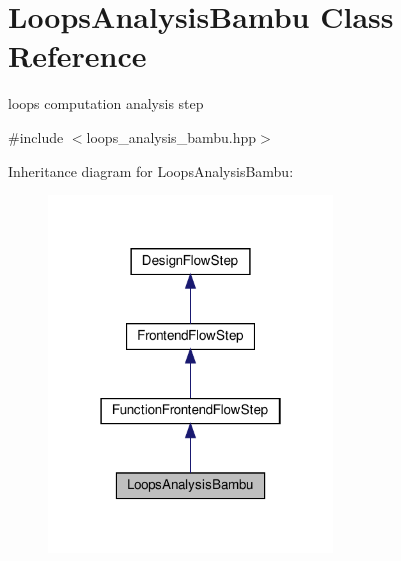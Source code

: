 \hypertarget{classLoopsAnalysisBambu}{}\section{Loops\+Analysis\+Bambu Class Reference}
\label{classLoopsAnalysisBambu}


loops computation analysis step  




{\ttfamily \#include $<$loops\+\_\+analysis\+\_\+bambu.\+hpp$>$}



Inheritance diagram for Loops\+Analysis\+Bambu\+:
\nopagebreak
\begin{figure}[H]
\begin{center}
\leavevmode
\includegraphics[width=214pt]{d5/dde/classLoopsAnalysisBambu__inherit__graph}
\end{center}
\end{figure}


